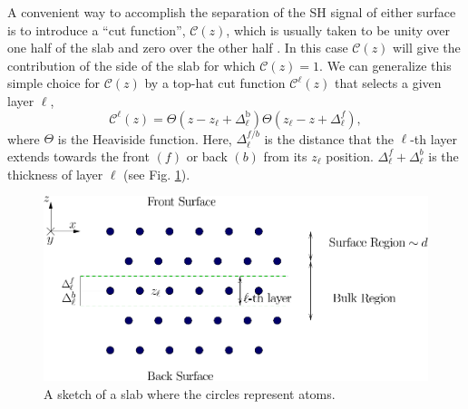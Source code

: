 A convenient way to accomplish the separation of the SH signal of either surface
is to introduce a ``cut function'', $\mathcal{C}(z)$, which is usually taken to be
unity over one half of the slab and zero over the other half \cite{reiningPRB94}.
In this case $\mathcal{C}(z)$ will give the contribution of the side of the slab for
which $\mathcal{C}(z)=1$. We can generalize this simple choice for $\mathcal{C}(z)$ by a
top-hat cut function $\mathcal{C}^{\ell}(z)$ that selects a given layer $\ell$,
\begin{equation}
\label{sz}
\mathcal{C}^{\ell}(z)=\Theta(z-z_\ell+\Delta_\ell^{\mathrm{b}})
            \Theta(z_\ell-z+\Delta_\ell^f),
\end{equation}
where $\Theta$ is the Heaviside function. Here, $\Delta_\ell^{f/b}$
is the distance that the $\ell$-th layer extends towards the front
$(f)$ or back $(b)$ from its $z_\ell$ position. 
$\Delta_\ell^f+\Delta_\ell^b$ is the thickness of layer $\ell$ 
(see Fig. \ref{fslab}).
\begin{figure}[b]
\centering
\includegraphics[scale=.7]{content/figures/diag-slab}
\caption{A sketch of a slab where the circles represent atoms.\label{fslab}}
\end{figure}

